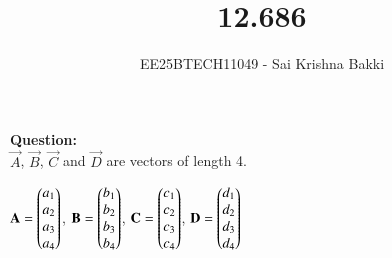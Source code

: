 \documentclass[journal]{IEEEtran}
\begin{document}

\vspace{3cm}

\title{12.686}
\author{EE25BTECH11049 - Sai Krishna Bakki}
\maketitle
\vspace{-3em}
\textbf{Question:}\\
$\vec{A}$, $\vec{B}$, $\vec{C}$ and $\vec{D}$ are vectors of length 4.

 $\mathbf{A} = \begin{pmatrix} a_1 \\ a_2 \\ a_3 \\ a_4 \end{pmatrix}$,
$\mathbf{B} = \begin{pmatrix}b_1 \\ b_2 \\ b_3 \\ b_4\end{pmatrix}$,
$\mathbf{C} = \begin{pmatrix} c_1 \\ c_2 \\ c_3 \\ c_4 \end{pmatrix}$,
$\mathbf{D} = \begin{pmatrix}d_1 \\ d_2 \\ d_3 \\ d_4 \end{pmatrix}$\\
\end{document}
